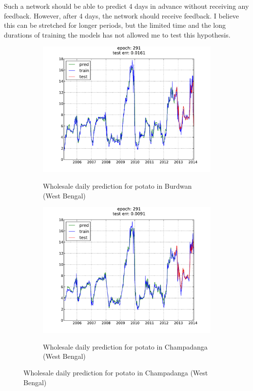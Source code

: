 Such a network should be able to predict 4 days in advance without receiving
any feedback. However, after 4 days, the network should receive feedback. I
believe this can be stretched for longer periods, but the limited time and the
long durations of training the models has not allowed me to test this
hypothesis.

\begin{figure}[H]
    \centering
        \begin{subfigure}[b]{.45\linewidth}
        \centering
        \includegraphics[width=\textwidth]{img/ffnn/5.pdf}
        \label{subfig:ffnn_pred_5}
        \caption{Wholesale daily prediction for potato in Burdwan (West Bengal)}
        \end{subfigure}
        \begin{subfigure}[b]{.45\linewidth}
        \centering
        \includegraphics[width=\textwidth]{img/ffnn/6.pdf}
        \label{subfig:ffnn_pred_6}
        \caption{Wholesale daily prediction for potato in Champadanga (West Bengal)}
        \end{subfigure}
\end{figure}


